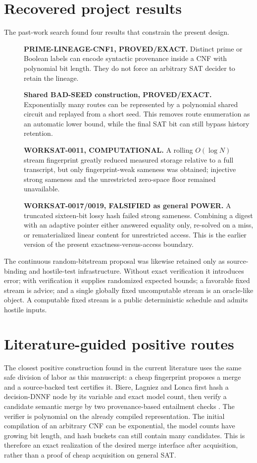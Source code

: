 \documentclass[11pt]{article}
\begin{document}
\section{Recovered project results}
The past-work search found four results that constrain the present design.
\begin{description}
\item[] \textbf{PRIME-LINEAGE-CNF1, PROVED/EXACT.} Distinct prime or Boolean
labels can encode syntactic provenance inside a CNF with polynomial bit
length.  They do not force an arbitrary SAT decider to retain the lineage.
\item[] \textbf{Shared BAD-SEED construction, PROVED/EXACT.} Exponentially
many routes can be represented by a polynomial shared circuit and replayed
from a short seed.  This removes route enumeration as an automatic lower
bound, while the final SAT bit can still bypass history retention.
\item[] \textbf{WORKSAT-0011, COMPUTATIONAL.} A rolling $O(\log N)$ stream
fingerprint greatly reduced measured storage relative to a full transcript,
but only fingerprint-weak sameness was obtained; injective strong sameness
and the unrestricted zero-space floor remained unavailable.
\item[] \textbf{WORKSAT-0017/0019, FALSIFIED as general POWER.} A truncated
sixteen-bit lossy hash failed strong sameness.  Combining a digest with an
adaptive pointer either answered equality only, re-solved on a miss, or
rematerialized linear content for unrestricted access.  This is the earlier
version of the present exactness-versus-access boundary.
\end{description}

The continuous random-bitstream proposal was likewise retained only as
source-binding and hostile-test infrastructure.  Without exact verification
it introduces error; with verification it supplies randomized expected
bounds; a favorable fixed stream is advice; and a single globally fixed
uncomputable stream is an oracle-like object.  A computable fixed stream is a
public deterministic schedule and admits hostile inputs.

\section{Literature-guided positive routes}
The closest positive construction found in the current literature uses the
same safe division of labor as this manuscript: a cheap fingerprint proposes
a merge and a source-backed test certifies it.  Biere, Lagniez and Lonca first
hash a decision-DNNF node by its variable and exact model count, then verify a
candidate semantic merge by two provenance-based entailment checks
\cite{bierelagniezlonca2026}.  The verifier is polynomial on the already
compiled representation.  The initial compilation of an arbitrary CNF can
be exponential, the model counts have growing bit length, and hash buckets
can still contain many candidates.  This is therefore an exact realization
of the desired merge interface after acquisition, rather than a proof of
cheap acquisition on general SAT.
\end{document}
